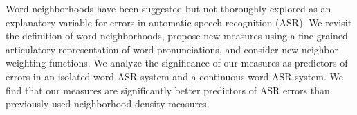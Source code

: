 Word neighborhoods have been suggested but not thoroughly explored as an explanatory variable for errors in automatic speech recognition (ASR). We revisit the definition of word neighborhoods, propose new measures using a fine-grained articulatory representation of word pronunciations, and consider new neighbor weighting functions. We analyze the significance of our measures as predictors of errors in an isolated-word ASR system and a continuous-word ASR system. We find that our measures are significantly better predictors of ASR errors than previously used neighborhood density measures.
